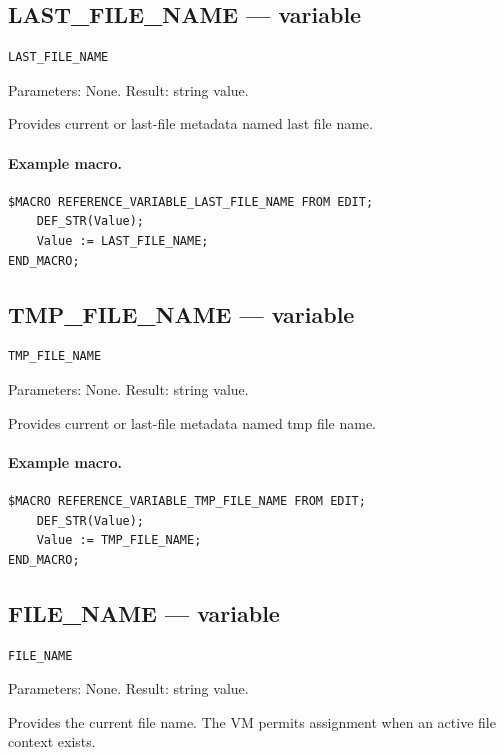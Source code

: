 \documentclass[a4paper,10pt,twoside,openany]{book}
\begin{document}
\subsection*{LAST\_FILE\_NAME --- variable}
\begin{verbatim}
LAST_FILE_NAME
\end{verbatim}
Parameters: None. Result: string value.

Provides current or last-file metadata named last file name.

\paragraph{Example macro.}
\begin{verbatim}
$MACRO REFERENCE_VARIABLE_LAST_FILE_NAME FROM EDIT;
    DEF_STR(Value);
    Value := LAST_FILE_NAME;
END_MACRO;
\end{verbatim}

\label{prim:variable-tmp-file-name}
\subsection*{TMP\_FILE\_NAME --- variable}
\begin{verbatim}
TMP_FILE_NAME
\end{verbatim}
Parameters: None. Result: string value.

Provides current or last-file metadata named tmp file name.

\paragraph{Example macro.}
\begin{verbatim}
$MACRO REFERENCE_VARIABLE_TMP_FILE_NAME FROM EDIT;
    DEF_STR(Value);
    Value := TMP_FILE_NAME;
END_MACRO;
\end{verbatim}

\label{prim:variable-file-name}
\subsection*{FILE\_NAME --- variable}
\begin{verbatim}
FILE_NAME
\end{verbatim}
Parameters: None. Result: string value.

Provides the current file name. The VM permits assignment when an active file context exists.
\end{document}
